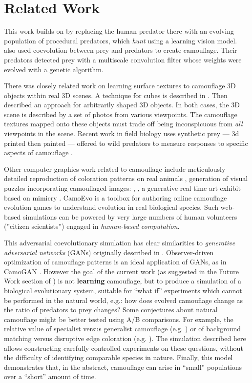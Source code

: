 \documentclass[letterpaper]{article}
\newcommand{\jargon}[1]{\textit{#1}}
\begin{document}
\section{Related Work}
This work builds on \citet{reynolds_iec_2011} by replacing the human predator there with an evolving population of procedural predators, which \jargon{hunt} using a learning vision model. \citet{harrington_coevolution_2014} also used coevolution between prey and predators to create camouflage. Their predators detected prey with a multiscale convolution filter whose weights were evolved with a genetic algorithm.
\par
There was closely related work on learning surface textures to camouflage 3D objects within real 3D scenes. A technique for cubes is described in \citet{owens_camouflaging_2014}. Then \citet{guo_ganmouflage_2022} described an approach for arbitrarily shaped 3D objects. In both cases, the 3D scene is described by a set of photos from various viewpoints. The camouflage textures mapped onto these objects must trade off being inconspicuous from \textit{all} viewpoints in the scene. Recent work in field biology uses synthetic prey --- 3d printed then painted --- offered to wild predators to measure responses to specific aspects of camouflage \citep{kelley_role_2023}.
\par
Other computer graphics work related to camouflage include meticulously detailed reproduction of coloration patterns on real animals \citep{de_gomensoro_malheiros_leopard_2020}, generation of visual puzzles incorporating camouflaged images: \citep{chu_camo_image_2010}, \citep{Zhang_Yin_Nie_Zheng_2020}, a generative real time art exhibit based on mimicry \citep{wu_mimicry_2021}. CamoEvo \citep{hancock_camoevo_2022} is a toolbox for authoring online camouflage evolution games to understand evolution in real biological species. Such web-based simulations can be powered by very large numbers of human volunteers (''citizen scientists'') engaged in \jargon{human-based computation}.
\par
This adversarial coevolutionary simulation has clear similarities to \jargon{generative adversarial networks} (GANs) originally described in \citet{goodfellow_gan_2014}. Observer-driven optimization of camouflage patterns is an ideal application of GANs, as in CamoGAN \citep{talas_camogan_2020}. However the goal of the current work (as suggested in the Future Work section of \citet{reynolds_iec_2011}) is not \textbf{learning} camouflage, but to produce a simulation of a biological evolutionary system, suitable for ``what if'' experiments which cannot be performed in the natural world, e.g.: how does evolved camouflage change as the ratio of predators to prey changes? Some conjectures about natural camouflage might be better tested using A/B comparisons. For example, the relative value of specialist versus generalist camouflage (e.g. \citet{hughes_imperfect_2019}) or of background matching versus disruptive edge coloration (e.g. \citet{price_background_2019}). The simulation described here allows constructing carefully controlled experiments on these questions, without the difficulty of identifying comparable species in nature. Finally, this model demonstrates that, in the abstract, camouflage can arise in ``small'' populations over a ``short'' amount of time.
\end{document}
